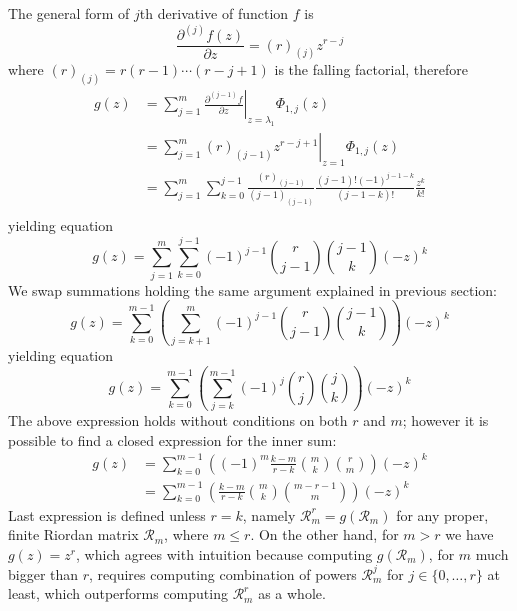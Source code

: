 
The general form of $j$th derivative of function $f$ is 
$$\frac{\partial^{(j)}{f}(z)}{\partial{z}} = (r)_{(j)} z^{r-j}$$ 
where $(r)_{(j)} = r(r-1)\cdots(r-j+1)$ is the falling factorial, therefore
\begin{displaymath}
\begin{split}
  g(z) &= \sum_{j=1}^{m}{ \left. \frac{\partial^{(j-1)}{f}}{\partial{z}} \right|_{z=\lambda_{1}}\Phi_{1,j}(z)} \\
       &= \sum_{j=1}^{m}{ \left. (r)_{(j-1)} z^{r-j+1} \right|_{z=1}\Phi_{1,j}(z)} \\
       &= \sum_{j=1}^{m}{\sum_{k=0}^{j-1}{\frac{(r)_{(j-1)}}{(j-1)_{(j-1)}}\frac{(j-1)!(-1)^{j-1-k}}{(j-1-k)!}\frac{z^{k}}{k!}}} \\
\end{split}
\end{displaymath}
yielding equation
\begin{equation}
  g(z) = \sum_{j=1}^{m}{\sum_{k=0}^{j-1}{(-1)^{j-1}{{r}\choose{j-1}}{{j-1}\choose{k}}(-z)^{k}}} 
\end{equation}
We swap summations holding the same argument explained in previous section:
\begin{displaymath}
  g(z) = \sum_{k=0}^{m-1}{\left(\sum_{j=k+1}^{m}{(-1)^{j-1}{{r}\choose{j-1}}{{j-1}\choose{k}}}\right)(-z)^{k}}
\end{displaymath}
yielding equation
\begin{equation}
  g(z) = \sum_{k=0}^{m-1}{\left(\sum_{j=k}^{m-1}{(-1)^{j}{{r}\choose{j}}{{j}\choose{k}}}\right)(-z)^{k}}
\end{equation}
The above expression holds without conditions on both $r$ and $m$; however it is possible 
to find a closed expression for the inner sum:
\begin{eqnarray}
  g(z) &= \sum_{k=0}^{m-1}{\left(\left(-1\right)^{m}\frac{ k - m }{r-k}{\binom{m}{k}} {\binom{r}{m}}\right)(-z)^{k}}\\
       &= \sum_{k=0}^{m-1}{\left(\frac{ k - m }{r-k}{\binom{m}{k}} {\binom{m-r-1}{m}}\right)(-z)^{k}}
\end{eqnarray}
Last expression is defined unless $r=k$, namely $\mathcal{R}_{m}^{r}=g(\mathcal{R}_{m})$ for any proper, 
finite Riordan matrix $\mathcal{R}_{m}$, where $m\leq r$. On the other hand, for $m>r$ we have 
$g(z)=z^{r}$, which agrees with intuition because computing $g(\mathcal{R}_{m})$, for $m$ much bigger than $r$, 
requires computing combination of powers $\mathcal{R}_{m}^{j}$ for $j\in \lbrace 0,\ldots,r \rbrace$ at least,
which outperforms computing $\mathcal{R}_{m}^{r}$ as a whole.

